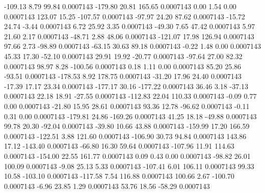      -109.13        8.79       99.84     0.0007143
     -179.80       20.81      165.65     0.0007143
        0.00        1.54        0.00     0.0007143
      123.07       15.25     -107.57     0.0007143
      -97.97       24.20       87.62     0.0007143
      -15.72       24.74       -3.44     0.0007143
        6.72       25.92        3.35     0.0007143
      -49.30        7.65       47.42     0.0007143
        5.97       21.60        2.17     0.0007143
      -48.71        2.88       48.06     0.0007143
     -121.07       17.98      126.94     0.0007143
       97.66        2.73      -98.89     0.0007143
      -63.15       30.63       89.18     0.0007143
       -0.22        1.48        0.00     0.0007143
       45.33       17.30      -52.10     0.0007143
       29.91       19.92      -20.77     0.0007143
      -97.64       27.00       82.32     0.0007143
       98.97        8.28     -100.56     0.0007143
        0.18        1.11        0.00     0.0007143
       85.20       25.86      -93.51     0.0007143
     -178.53        8.92      178.75     0.0007143
      -31.20       17.96       24.40     0.0007143
      -17.39       17.17       23.34     0.0007143
     -177.17       30.16     -177.22     0.0007143
       36.46        3.18      -37.13     0.0007143
       22.18       18.91      -27.55     0.0007143
     -112.83       22.04      110.33     0.0007143
       -0.09        0.77        0.00     0.0007143
      -21.80       15.95       28.61     0.0007143
       93.36       12.78      -96.62     0.0007143
       -0.11        0.31        0.00     0.0007143
     -179.81       24.86     -169.26     0.0007143
       41.25       18.18      -49.88     0.0007143
       99.78       20.30      -92.04     0.0007143
      -39.80       10.66       43.88     0.0007143
     -159.99       17.20      166.59     0.0007143
     -122.51        3.88      121.60     0.0007143
     -106.90       30.73       94.84     0.0007143
      143.86       17.12     -143.40     0.0007143
      -66.80       16.30       59.64     0.0007143
     -107.96       11.91      114.63     0.0007143
     -154.00       22.55      161.77     0.0007143
        0.09        0.43        0.00     0.0007143
      -98.82       26.01      100.09     0.0007143
       -9.08       25.13        5.33     0.0007143
     -107.41        6.01      106.11     0.0007143
       99.33       10.58     -103.10     0.0007143
     -117.58        7.54      116.88     0.0007143
      100.66        2.67     -100.70     0.0007143
       -6.96       23.85        1.29     0.0007143
       53.76       18.56      -58.29     0.0007143

